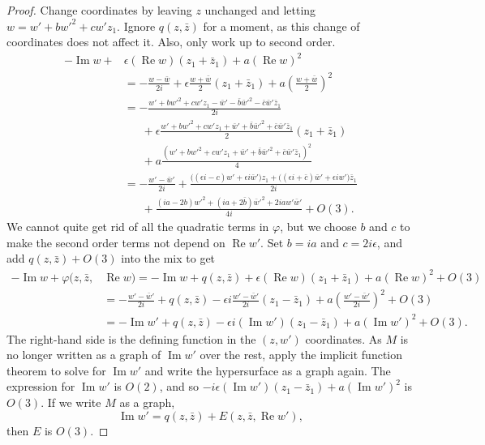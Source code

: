 \documentclass[12pt,openany]{book}
\renewcommand{\Re}{\operatorname{Re}}
\renewcommand{\Im}{\operatorname{Im}}
\theoremstyle{plain}
\theoremstyle{remark}
\theoremstyle{definition}
\theoremstyle{exercise}
\theoremstyle{example}
\begin{document}
\begin{proof}
Change coordinates
by leaving $z$ unchanged and letting $w = w'+bw'^2+cw'z_1$.  Ignore
$q(z,\bar{z})$ for a moment, as
this change of coordinates does not affect it.  Also, only work up to
second order.
\begin{equation*}
\begin{split}
-\Im w +
& \epsilon (\Re w) (z_1+\bar{z}_1)
+
a {(\Re w)}^2
\\
& =
-\frac{w-\bar{w}}{2i} +
\epsilon \frac{w+\bar{w}}{2}(z_1+\bar{z}_1)
+
a{\left(\frac{w+\bar{w}}{2}\right)}^2
\\
& =
-\frac{w'+bw'^2+cw'z_1-\bar{w}'-\bar{b}\bar{w}'^2-\bar{c}\bar{w}'\bar{z}_1}{2i}
\\
& \phantom{=}~
+\epsilon \frac{w'+bw'^2+cw'z_1+\bar{w}'+\bar{b}\bar{w}'^2+\bar{c}\bar{w}'\bar{z}_1}{2}(z_1+\bar{z}_1)
\\
& \phantom{=}~
+ a \frac{{(w'+bw'^2+cw'z_1+\bar{w}'+\bar{b}\bar{w}'^2+\bar{c}\bar{w}'\bar{z}_1)}^2}{4}
\\
& =
-\frac{w'-\bar{w}'}{2i}
+\frac{
\bigl((\epsilon i-c)w'
+\epsilon i\bar{w}'\bigr)z_1
+\bigl((\epsilon i+\bar{c})\bar{w}'
+\epsilon iw'\bigr)\bar{z}_1
}{2i}
\\
& \phantom{=}~
+ \frac{(ia-2b)w'^2+(ia+2\bar{b})\bar{w}'^2+2iaw'\bar{w}'}{4i}
+O(3) .
\end{split}
\end{equation*}
We cannot quite get rid of all the quadratic terms in $\varphi$, but we
choose $b$ and $c$ to make the second order terms not depend on $\Re w'$.
Set $b=ia$ and $c=2i\epsilon$, and add $q(z,\bar{z}) + O(3)$ into the mix
to get
\begin{equation*}
\begin{split}
-\Im w + \varphi(z,\bar{z}, & \Re w)  =
-\Im w +
q(z,\bar{z}) +
\epsilon (\Re w) (z_1+\bar{z}_1)
+ a{(\Re w)}^2
+O(3)
\\
& =
-\frac{w'-\bar{w}'}{2i}
+
q(z,\bar{z})
- \epsilon i
\frac{w' -\bar{w}'}{2i}
( z_1 -\bar{z}_1)
+ a {\left(\frac{w'-\bar{w}'}{2i}\right)}^2
+O(3)
\\
& =
-\Im w'
+ q(z,\bar{z})
-
\epsilon i
(\Im w')
( z_1 -\bar{z}_1)
+
a {(\Im w')}^2
+O(3) .
\end{split}
\end{equation*}
The right-hand side is the defining function in the $(z,w')$ coordinates.
As $M$ is no longer written as a graph of $\Im w'$ over the
rest, apply the implicit
function theorem to solve for $\Im w'$
and write the hypersurface as a graph again.
The expression for $\Im w'$
is $O(2)$, and so $-i\epsilon (\Im w')(z_1-\bar{z}_1)+a{(\Im w')}^2$
is $O(3)$.
If we write $M$ as a graph,
\begin{equation*}
\Im w' = q(z,\bar{z}) + E(z,\bar{z},\Re w'),
\end{equation*}
then $E$ is $O(3)$.


\end{proof}
\end{document}

